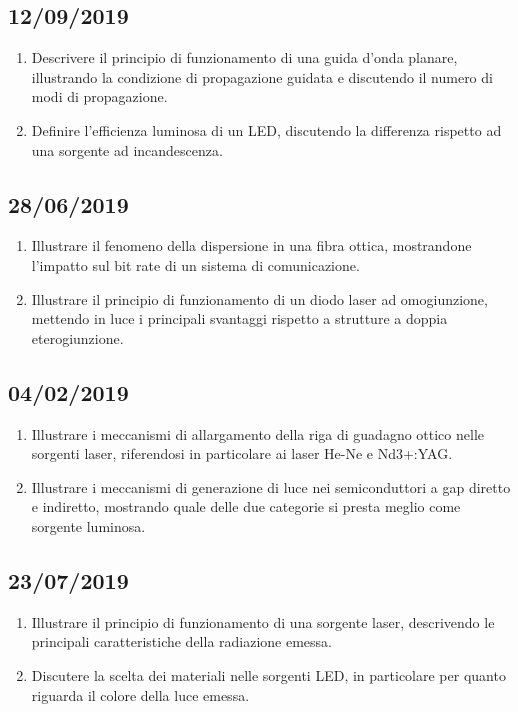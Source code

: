 \documentclass{article}
\begin{document}
\subsection{12/09/2019}
\begin{enumerate}
  \item Descrivere il principio di funzionamento di una guida d’onda planare, illustrando la condizione di propagazione
        guidata e discutendo il numero di modi di propagazione.
  \item Definire l’efficienza luminosa di un LED, discutendo la differenza rispetto ad una sorgente ad incandescenza.
\end{enumerate}

\subsection{28/06/2019}
\begin{enumerate}
  \item Illustrare il fenomeno della dispersione in una fibra ottica, mostrandone l’impatto sul bit rate di un sistema di
        comunicazione.
  \item Illustrare il principio di funzionamento di un diodo laser ad omogiunzione, mettendo in luce i principali svantaggi
        rispetto a strutture a doppia eterogiunzione.
\end{enumerate}

\subsection{04/02/2019}
\begin{enumerate}
  \item Illustrare i meccanismi di allargamento della riga di guadagno ottico nelle sorgenti laser, riferendosi in particolare
        ai laser He-Ne e Nd3+:YAG.
  \item Illustrare i meccanismi di generazione di luce nei semiconduttori a gap diretto e indiretto, mostrando quale delle
        due categorie si presta meglio come sorgente luminosa.
\end{enumerate}

\subsection{23/07/2019}
\begin{enumerate}
  \item Illustrare il principio di funzionamento di una sorgente laser, descrivendo le principali caratteristiche della
        radiazione emessa.
  \item Discutere la scelta dei materiali nelle sorgenti LED, in particolare per quanto riguarda il colore della luce emessa.
\end{enumerate}
\end{document}
